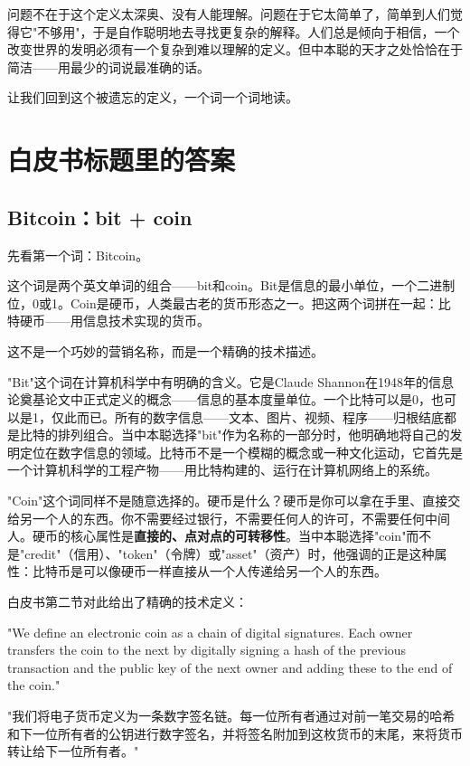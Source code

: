 \documentclass[a4paper,12pt,openany]{ctexbook}
\newenvironment{quoting}{%
  \par\vspace{0.5em}%
  \begin{list}{}{%
    \setlength{\leftmargin}{2em}%
    \setlength{\rightmargin}{2em}%
    \setlength{\parsep}{0.3em}%
    \setlength{\itemsep}{0pt}%
    \setlength{\topsep}{0pt}%
  }%
  \item\relax
}{%
  \end{list}%
  \par\vspace{0.5em}%
}
\begin{document}
问题不在于这个定义太深奥、没有人能理解。问题在于它太简单了，简单到人们觉得它"不够用"，于是自作聪明地去寻找更复杂的解释。人们总是倾向于相信，一个改变世界的发明必须有一个复杂到难以理解的定义。但中本聪的天才之处恰恰在于简洁——用最少的词说最准确的话。

让我们回到这个被遗忘的定义，一个词一个词地读。


\section*{白皮书标题里的答案}



\subsection*{Bitcoin：bit + coin}


先看第一个词：Bitcoin。

这个词是两个英文单词的组合——bit和coin。Bit是信息的最小单位，一个二进制位，0或1。Coin是硬币，人类最古老的货币形态之一。把这两个词拼在一起：比特硬币——用信息技术实现的货币。

这不是一个巧妙的营销名称，而是一个精确的技术描述。

"Bit"这个词在计算机科学中有明确的含义。它是Claude Shannon在1948年的信息论奠基论文中正式定义的概念——信息的基本度量单位。一个比特可以是0，也可以是1，仅此而已。所有的数字信息——文本、图片、视频、程序——归根结底都是比特的排列组合。当中本聪选择"bit"作为名称的一部分时，他明确地将自己的发明定位在数字信息的领域。比特币不是一个模糊的概念或一种文化运动，它首先是一个计算机科学的工程产物——用比特构建的、运行在计算机网络上的系统。

"Coin"这个词同样不是随意选择的。硬币是什么？硬币是你可以拿在手里、直接交给另一个人的东西。你不需要经过银行，不需要任何人的许可，不需要任何中间人。硬币的核心属性是\textbf{直接的、点对点的可转移性}。当中本聪选择"coin"而不是"credit"（信用）、"token"（令牌）或"asset"（资产）时，他强调的正是这种属性：比特币是可以像硬币一样直接从一个人传递给另一个人的东西。

白皮书第二节对此给出了精确的技术定义：


\begin{quoting}
\small
"We define an electronic coin as a chain of digital signatures. Each owner transfers the coin to the next by digitally signing a hash of the previous transaction and the public key of the next owner and adding these to the end of the coin."

"我们将电子货币定义为一条数字签名链。每一位所有者通过对前一笔交易的哈希和下一位所有者的公钥进行数字签名，并将签名附加到这枚货币的末尾，来将货币转让给下一位所有者。"
\end{quoting}
\end{document}
